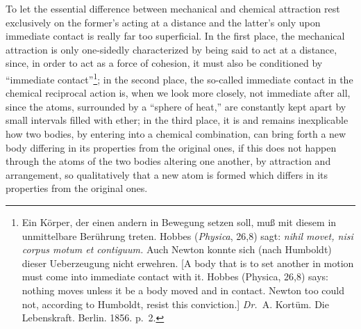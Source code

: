 \documentclass[12pt,a4paper]{book}
\begin{document}
To let the essential difference between mechanical and chemical attraction rest
exclusively on the former's acting at a distance and the latter's only upon
immediate contact is really far too superficial. In the first place, the
mechanical attraction is only one-sidedly characterized by being said to act at
a distance, since, in order to act as a force of cohesion, it must also be
conditioned by ``immediate contact''\footnote{Ein Körper, der einen andern in
Bewegung setzen soll, muß mit diesem in unmittelbare Berührung treten.
Hobbes (\textit{Physica}, 26,8) sagt: \textit{nihil movet, nisi
corpus motum et contiguum.} Auch Newton konnte sich (nach
Humboldt) dieser Ueberzeugung nicht erwehren. [A body that is to set another in
motion must come into immediate contact with it. Hobbes (Physica, 26,8) says:
nothing moves unless it be a body moved and in contact. Newton too could not,
according to Humboldt, resist this conviction.] \textit{Dr.}\
A. Kortüm. Die Lebenskraft. Berlin. 1856. p.~2.
}; in the second place, the so-called immediate contact in the chemical
reciprocal action is, when we look more closely, not immediate after all, since
the atoms, surrounded by a ``sphere of heat,'' are constantly kept apart by
small intervals filled with ether; in the third place, it is and remains
inexplicable how two bodies, by entering into a chemical combination, can bring
forth a new body differing in its properties from the original ones, if this
does
not happen through the atoms of the two bodies altering one another, by
attraction and arrangement, so qualitatively that a new atom is formed which
differs in its properties from the original ones.
\end{document}
